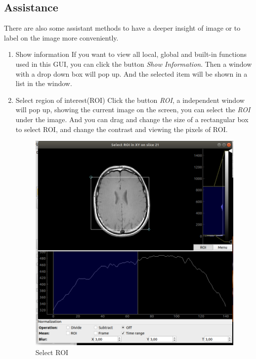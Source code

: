 \documentclass[12pt]{article}
\begin{document}
\subsection{Assistance}
There are also some assistant methods to have a deeper insight of image or to label on the image more conveniently.
\begin{enumerate}
	\item Show information
	\newline If you want to view all local, global and built-in functions used in this GUI, you can click the button \textit{Show Information}. Then a window with a drop down box will pop up. And the selected item will be shown in a list in the window.
	\item Select region of interest(ROI)
	\newline Click the button \textit{ROI}, a independent window will pop up, showing the current image on the screen, you can select the \textit{ROI} under the image. And you can drag and change the size of a rectangular box to select ROI, and change the contrast and viewing the pixels of ROI.
	\begin{figure}[htbp]	
		\centering
		\includegraphics[width=\textwidth]{select_ROI.png}
		\caption[Select ROI]{Select ROI}
		\label{fig:select_ROI}
	\end{figure}

\end{enumerate}
\end{document}
